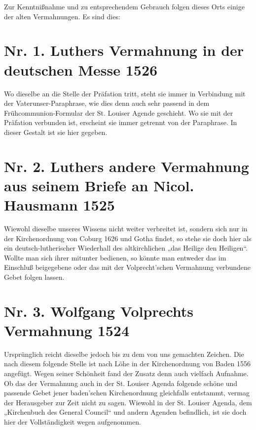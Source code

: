 Zur Kenntnißnahme und zu entsprechendem Gebrauch folgen dieses Orts einige der alten Vermahnungen. Es sind dies:

\section[Nr. 1. Luthers Vermahnung]{Nr. 1. Luthers Vermahnung in der deutschen Messe 1526}
Wo dieselbe an die Stelle der Präfation tritt, steht sie immer in Verbindung mit der Vaterunser-Paraphrase, wie dies denn auch sehr passend in dem Frühcommunion-Formular der St. Louiser Agende geschieht. Wo sie mit der Präfation verbunden ist, erscheint sie immer getrennt von der Paraphrase. In dieser Gestalt ist sie hier gegeben.

\section[Nr. 2. Luthers andere Vermahnung]{Nr. 2. Luthers andere Vermahnung aus seinem Briefe an Nicol. Hausmann 1525}
Wiewohl dieselbe unseres Wissens nicht weiter verbreitet ist, sondern sich nur in der Kirchenordnung von Coburg 1626 und Gotha findet,
so stehe sie doch hier als ein deutsch-lutherischer Wiederhall des altkirchlichen „das Heilige den Heiligen“. Wollte man sich ihrer mitunter bedienen, so könnte man entweder das im Einschluß beigegebene oder das mit der Volprecht’schen Vermahnung verbundene Gebet folgen lassen.

\section[Nr. 3. Wolfgang Volprechts Vermahnung]{Nr. 3. Wolfgang Volprechts Vermahnung 1524}
Ursprünglich reicht dieselbe jedoch bis zu dem von uns gemachten Zeichen. Die nach diesem folgende Stelle ist nach Löhe in der Kirchenordnung von Baden 1556 angefügt. Wegen seiner Schönheit fand der Zusatz denn auch vielfach Aufnahme. Ob das der Vermahnung auch in der St. Louiser Agenda folgende schöne und passende Gebet jener baden’schen Kirchenordnung gleichfalls entstammt, vermag der Herausgeber zur Zeit nicht zu sagen. Wiewohl in der St. Louiser Agenda, dem „Kirchenbuch des General Council“ und andern Agenden befindlich, ist sie doch hier der Vollständigkeit wegen aufgenommen.

